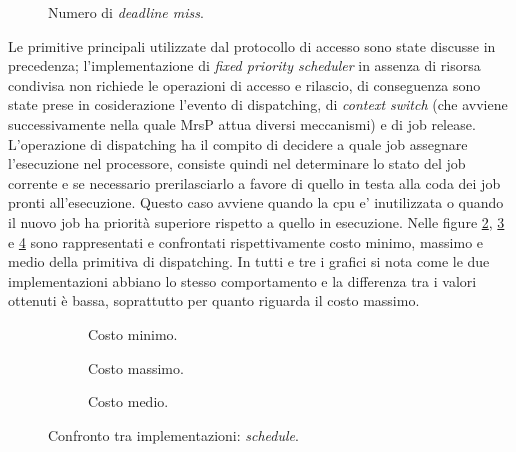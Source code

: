   \begin{figure}
    \graficoUno
    \caption{Numero di \textit{deadline miss}.} %
    \label{fig:DLM}
  \end{figure}

\noindent Le primitive principali utilizzate dal protocollo di accesso sono state discusse in precedenza; l'implementazione di \textit{fixed priority scheduler} in assenza di risorsa condivisa non richiede le operazioni di accesso e rilascio, di conseguenza sono state prese in cosiderazione l'evento di dispatching, di \textit{context switch} (che avviene successivamente nella quale MrsP attua diversi meccanismi) e di job release.\\

\noindent L'operazione di dispatching ha il compito di decidere a quale job assegnare l'esecuzione nel processore, consiste quindi nel determinare lo stato del job corrente e se necessario prerilasciarlo a favore di quello in testa alla coda dei job pronti all'esecuzione. Questo caso avviene quando la cpu e' inutilizzata o quando il nuovo job ha priorità superiore rispetto a quello in esecuzione. Nelle figure \ref{fig:schedMin}, \ref{fig:schedMax} e \ref{fig:schedAvg} sono rappresentati e confrontati rispettivamente costo minimo, massimo e medio della primitiva di dispatching. In tutti e tre i grafici si nota come le due implementazioni abbiano lo stesso comportamento e la differenza tra i valori ottenuti è bassa, soprattutto per quanto riguarda il costo massimo.\\

  \begin{figure}[htb]
    \centering
      \begin{subfigure}[b]{0.49\textwidth}
        \centering
        \resizebox{\linewidth}{!}\graficoSchedMIN  
        \caption{Costo minimo.}
        \label{fig:schedMin}
      \end{subfigure}
      \begin{subfigure}[b]{0.49\textwidth}
        \centering
        \resizebox{\linewidth}{!}\graficoSchedMAX
        \caption{Costo massimo.}
        \label{fig:schedMax}
      \end{subfigure}
      \begin{subfigure}[b]{0.49\textwidth}
        \centering
        \resizebox{\linewidth}{!}\graficoSchedAVG
        \caption{Costo medio.}
        \label{fig:schedAvg}
      \end{subfigure}

    \caption{Confronto tra implementazioni: \textit{schedule}.}
    \label{fig:sched}
  \end{figure}


